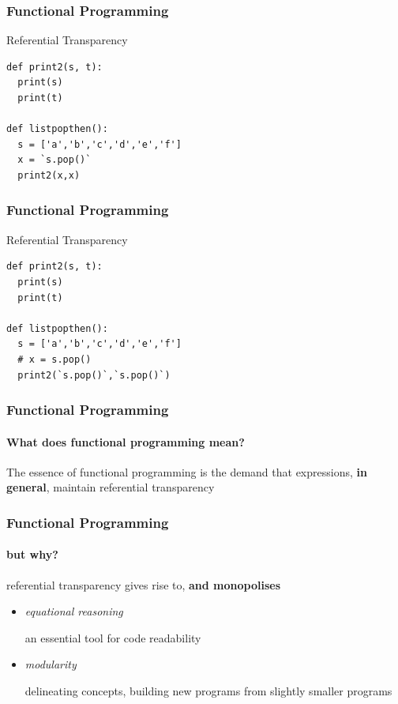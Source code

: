 \begin{frame}[fragile]
\frametitle{Functional Programming}
\begin{block}{Referential Transparency}
\begin{lstlisting}[style=python,mathescape]
def print2(s, t):
  print(s)
  print(t)

def listpopthen():
  s = ['a','b','c','d','e','f']
  x = `s.pop()`
  print2(x,x)
\end{lstlisting}
\end{block}
\end{frame}


\begin{frame}[fragile]
\frametitle{Functional Programming}
\begin{block}{Referential Transparency}
\begin{lstlisting}[style=python,mathescape]
def print2(s, t):
  print(s)
  print(t)

def listpopthen():
  s = ['a','b','c','d','e','f']
  # x = s.pop()
  print2(`s.pop()`,`s.pop()`)
\end{lstlisting}
\end{block}
\end{frame}


\begin{frame}
\frametitle{Functional Programming}
\framesubtitle{What does functional programming mean?}
\begin{block}{The essence of functional programming}
is the demand that expressions, \textbf{in general}, maintain referential transparency
\end{block}
\end{frame}


\begin{frame}
\frametitle{Functional Programming}
\framesubtitle{but why?}
\begin{block}{referential transparency gives rise to, \textbf{and monopolises}}
\begin{itemize}
\item \emph{equational reasoning}

      an essential tool for code readability
\item \emph{modularity}

      delineating concepts, building new programs from slightly smaller programs
\end{itemize}
\end{block}
\end{frame}


